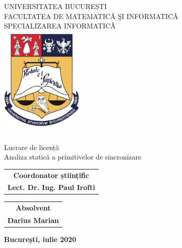 \begin{titlepage}
    \begin{center}
        \Large
        UNIVERSITATEA BUCUREȘTI
        \\FACULTATEA DE MATEMATICǍ ŞI INFORMATICǍ
        \\SPECIALIZAREA INFORMATICǍ
        \vspace*{0.5cm}
        \\\includegraphics[width=4cm]{resources/blazon.png}

        \vspace*{2cm}
        \LARGE Lucrare de licență
        \\\huge Analiza statică a primitivelor de sincronizare
        
        \vfill
    \end{center}
    \large
    \hspace*{1.5cm}
    \begin{tabular}{c@{}}
        \textbf{Coordonator științific} \\
        \textbf{Lect. Dr. Ing. Paul Irofti}
    \end{tabular}
    \hfill
    \begin{tabular}{c@{}}
        \textbf{Absolvent} \\
        \textbf{Darius Marian}
    \end{tabular}
    \hspace*{1.5cm}
    \vspace*{5.2cm}
    \begin{center}
        \textbf{București, iulie 2020}
    \end{center}
\end{titlepage}